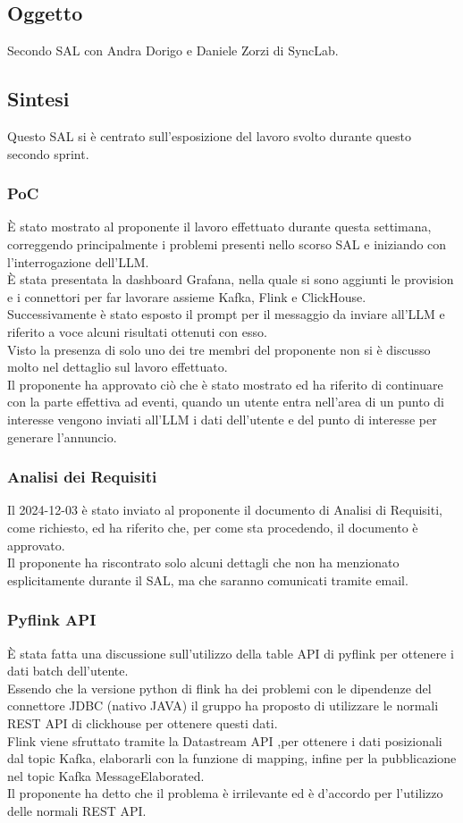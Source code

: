 \documentclass[12pt]{article}
\begin{document}
\subsection{Oggetto}
Secondo SAL con Andra Dorigo e Daniele Zorzi di SyncLab.

\subsection{Sintesi}
Questo SAL si è centrato sull'esposizione del lavoro svolto durante questo secondo sprint.
\subsubsection{PoC}
\`E stato mostrato al proponente il lavoro effettuato durante questa settimana, correggendo principalmente i problemi presenti nello scorso SAL e iniziando con l'interrogazione dell'LLM. \\
\`E stata presentata la dashboard Grafana, nella quale si sono aggiunti le provision e i connettori per far lavorare assieme Kafka, Flink e ClickHouse.\\
Successivamente è stato esposto il prompt per il messaggio da inviare all'LLM e riferito a voce alcuni risultati ottenuti con esso.\\
Visto la presenza di solo uno dei tre membri del proponente non si è discusso molto nel dettaglio sul lavoro effettuato.\\
Il proponente ha approvato ciò che è stato mostrato ed ha riferito di continuare con la parte effettiva ad eventi, quando un utente entra nell'area di un punto di interesse vengono inviati all'LLM i dati dell'utente e del punto di interesse per generare l'annuncio.

\subsubsection{Analisi dei Requisiti}
Il 2024-12-03 è stato inviato al proponente il documento di Analisi di Requisiti, come richiesto, ed ha riferito che, per come sta procedendo, il documento è approvato.\\
Il proponente ha riscontrato solo alcuni dettagli che non ha menzionato esplicitamente durante il SAL, ma che saranno comunicati tramite email.

\subsubsection{Pyflink API}
\`E stata fatta una discussione sull'utilizzo della table API di pyflink per ottenere i dati batch dell'utente.\\
Essendo che la versione python di flink ha dei problemi con le dipendenze del connettore JDBC (nativo JAVA) il gruppo ha proposto di utilizzare le normali REST API di clickhouse per ottenere questi dati.\\
Flink viene sfruttato tramite la Datastream API ,per ottenere i dati posizionali dal topic Kafka, elaborarli con la funzione di mapping, infine per la pubblicazione nel topic Kafka MessageElaborated.\\
Il proponente ha detto che il problema è irrilevante ed è d'accordo per l'utilizzo delle normali REST API.
\end{document}
